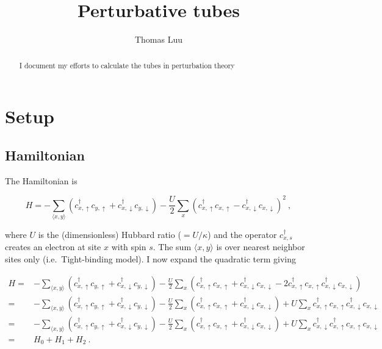 \documentclass[
  letterpaper,
  DIV=11,
  numbers=noendperiod]{scrartcl}
\title{Perturbative tubes}
\author{Thomas Luu}
\date{}
\begin{document}
\maketitle
\begin{abstract}
I document my efforts to calculate the tubes in perturbation theory
\end{abstract}


\section{Setup}\label{setup}

\subsection{Hamiltonian}\label{hamiltonian}

The Hamiltonian is

\begin{equation}\label{eqn:Hstart}
H = -\sum_{\langle x,y\rangle}\left(c^\dagger_{x,\uparrow}c^{}_{y,\uparrow}+c^\dagger_{x,\downarrow}c^{}_{y,\downarrow}\right)-\frac{U}{2}\sum_x\left(c^\dagger_{x,\uparrow}c^{}_{x,\uparrow}-c^\dagger_{x,\downarrow}c^{}_{x,\downarrow}\right)^2\ ,
\end{equation}

where \(U\) is the (dimensionless) Hubbard ratio (\(=U/\kappa\)) and the
operator \(c^\dagger_{x,s}\) creates an electron at site \(x\) with spin
\(s\). The sum \({\langle x,y\rangle}\) is over nearest neighbor sites
only (i.e.~Tight-binding model). I now expand the quadratic term giving

\begin{align}
H =&-\sum_{\langle x,y\rangle}\left(c^\dagger_{x,\uparrow}c^{}_{y,\uparrow}+c^\dagger_{x,\downarrow}c^{}_{y,\downarrow}\right)-\frac{U}{2}\sum_x\left(c^\dagger_{x,\uparrow}c^{}_{x,\uparrow}+c^\dagger_{x,\downarrow}c^{}_{x,\downarrow}-2c^\dagger_{x,\uparrow}c^{}_{x,\uparrow}c^\dagger_{x,\downarrow}c^{}_{x,\downarrow}\right)\\
=&-\sum_{\langle x,y\rangle}\left(c^\dagger_{x,\uparrow}c^{}_{y,\uparrow}+c^\dagger_{x,\downarrow}c^{}_{y,\downarrow}\right)-\frac{U}{2}\sum_x\left(c^\dagger_{x,\uparrow}c^{}_{x,\uparrow}+c^\dagger_{x,\downarrow}c^{}_{x,\downarrow}\right)+U\sum_xc^\dagger_{x,\uparrow}c^{}_{x,\uparrow}c^\dagger_{x,\downarrow}c^{}_{x,\downarrow}\\
=&-\sum_{\langle x,y\rangle}\left(c^\dagger_{x,\uparrow}c^{}_{y,\uparrow}+c^\dagger_{x,\downarrow}c^{}_{y,\downarrow}\right)-\frac{U}{2}\sum_x\left(c^\dagger_{x,\uparrow}c^{}_{x,\uparrow}+c^\dagger_{x,\downarrow}c^{}_{x,\downarrow}\right)+U\sum_xc^\dagger_{x,\downarrow}c^\dagger_{x,\uparrow}c^{}_{x,\uparrow}c^{}_{x,\downarrow}\\
=&H_0+H_1+H_2\ .
\end{align}
\end{document}
